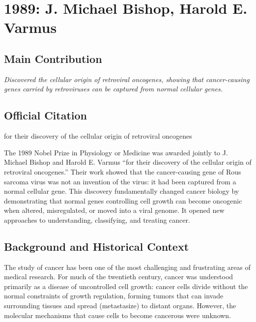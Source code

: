 \chapter[1989 --- Bishop et al.]{1989: J. Michael Bishop, Harold E. Varmus}
\label{ch:1989_Bishop}

\section*{Main Contribution}

\textit{Discovered the cellular origin of retroviral oncogenes, showing that cancer-causing genes carried by retroviruses can be captured from normal cellular genes.}\cite{nobel-1989,lecture-1989}

\section{Official Citation}

for their discovery of the cellular origin of retroviral oncogenes

The 1989 Nobel Prize in Physiology or Medicine was awarded jointly to J. Michael Bishop and Harold E. Varmus ``for their discovery of the cellular origin of retroviral oncogenes.'' Their work showed that the cancer-causing gene of Rous sarcoma virus was not an invention of the virus: it had been captured from a normal cellular gene. This discovery fundamentally changed cancer biology by demonstrating that normal genes controlling cell growth can become oncogenic when altered, misregulated, or moved into a viral genome. It opened new approaches to understanding, classifying, and treating cancer.

\section{Background and Historical Context}

The study of cancer has been one of the most challenging and frustrating areas of medical research. For much of the twentieth century, cancer was understood primarily as a disease of uncontrolled cell growth: cancer cells divide without the normal constraints of growth regulation, forming tumors that can invade surrounding tissues and spread (metastasize) to distant organs. However, the molecular mechanisms that cause cells to become cancerous were unknown.

